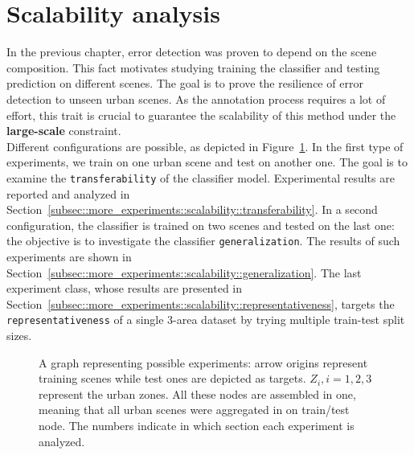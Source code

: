\minitoc

\vfill

\clearpage

\section{Scalability analysis}
    \label{sec::more_experiments::scalability}
    In the previous chapter, error detection was proven to depend on the scene composition.
    This fact motivates studying training the classifier and testing prediction on different scenes.
    The goal is to prove the resilience of error detection to unseen urban scenes.
    As the annotation process requires a lot of effort, this trait is crucial to guarantee the scalability of this method under the \textbf{large-scale} constraint.\\

    Different configurations are possible, as depicted in Figure~\ref{fig::scalability_study}.
    In the first type of experiments, we train on one urban scene and test on another one.
    The goal is to examine the \texttt{transferability} of the classifier model.
    Experimental results are reported and analyzed in Section~\ref{subsec::more_experiments::scalability::transferability}.
    In a second configuration, the classifier is trained on two scenes and tested on the last one: the objective is to investigate the classifier \texttt{generalization}.
    The results of such experiments are shown in Section~\ref{subsec::more_experiments::scalability::generalization}.
    The last experiment class, whose results are presented in Section~\ref{subsec::more_experiments::scalability::representativeness}, targets the \texttt{representativeness} of a single 3-area dataset by trying multiple train-test split sizes.\\

    \begin{figure}[htbp]
        \ffigbox[\FBwidth]{
            
        }
        {
            \caption{
                \label{fig::scalability_study}
                A graph representing possible experiments: arrow origins represent training scenes while test ones are depicted as targets.
                \(Z_i, i=1,2,3\) represent the urban zones.
                All these nodes are assembled in one, meaning that all urban scenes were aggregated in on train/test node.
                The numbers indicate in which section each experiment is analyzed.
            }
        }
    \end{figure}

